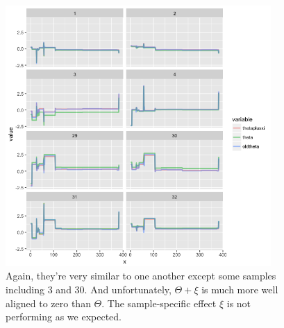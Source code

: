 \documentclass[11pt]{article}
\begin{document}
\begin{figure}[h]
\centering
\includegraphics[width=0.9\textwidth]{thetaonly.png}
\caption{ Again, they're very similar to one another except some samples including 3 and 30. And unfortunately, $\Theta + \xi$ is much more well aligned to zero than $\Theta$. The sample-specific effect $\xi$ is not performing as we expected. }
\label{thetaphi}
\end{figure}
\end{document}
